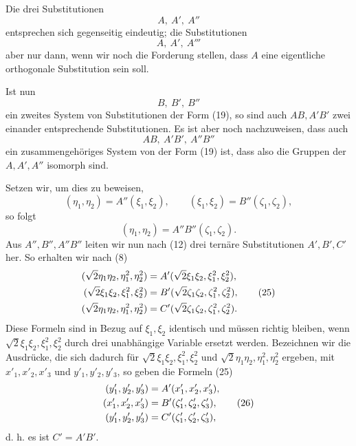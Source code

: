 \documentclass[11pt]{article}
\begin{document}
Die drei Substitutionen
\begin{equation}
A,\ A',\ A''
\tag{19}
\end{equation}
entsprechen sich gegenseitig eindeutig; die Substitutionen
\begin{equation}
A,\ A',\ A'''
\tag{20}
\end{equation}
aber nur dann, wenn wir noch die Forderung stellen, dass $A$ eine eigentliche orthogonale Substitution sein soll.

Ist nun
\begin{equation}
B,\ B',\ B''
\tag{21}
\end{equation}
ein zweites System von Substitutionen der Form (19), so sind auch $AB,A'B'$ zwei einander entsprechende Substitutionen. Es ist aber noch nachzuweisen, dass auch
\begin{equation}
AB,\ A'B',\ A''B''
\tag{22}
\end{equation}
ein zusammengehöriges System von der Form (19) ist, dass also die Gruppen der $A,A',A''$ isomorph sind.

Setzen wir, um dies zu beweisen,
\begin{equation}
(\eta_1,\eta_2)=A''(\xi_1,\xi_2),
\qquad
(\xi_1,\xi_2)=B''(\zeta_1,\zeta_2),
\tag{23}
\end{equation}
so folgt
\begin{equation}
(\eta_1,\eta_2)=A''B''(\zeta_1,\zeta_2).
\tag{24}
\end{equation}
Aus $A'',B'',A''B''$ leiten wir nun nach (12) drei ternäre Substitutionen $A',B',C'$ her. So erhalten wir nach (8)
\begin{align}
(\sqrt2\eta_1\eta_2,\eta_1^2,\eta_2^2)&=A'(\sqrt2\xi_1\xi_2,\xi_1^2,\xi_2^2),\notag\\
(\sqrt2\xi_1\xi_2,\xi_1^2,\xi_2^2)&=B'(\sqrt2\zeta_1\zeta_2,\zeta_1^2,\zeta_2^2),\tag{25}\\
(\sqrt2\eta_1\eta_2,\eta_1^2,\eta_2^2)&=C'(\sqrt2\zeta_1\zeta_2,\zeta_1^2,\zeta_2^2).\notag
\end{align}
Diese Formeln sind in Bezug auf $\xi_1,\xi_2$ identisch und müssen richtig bleiben, wenn $\sqrt2\xi_1\xi_2,\xi_1^2,\xi_2^2$ durch drei unabhängige Variable ersetzt werden. Bezeichnen wir die Ausdrücke, die sich dadurch für $\sqrt2\xi_1\xi_2,\xi_1^2,\xi_2^2$ und $\sqrt2\eta_1\eta_2,\eta_1^2,\eta_2^2$ ergeben, mit $x'_1,x'_2,x'_3$ und $y'_1,y'_2,y'_3$, so geben die Formeln (25)
\begin{align}
(y'_1,y'_2,y'_3)&=A'(x'_1,x'_2,x'_3),\notag\\
(x'_1,x'_2,x'_3)&=B'(\zeta'_1,\zeta'_2,\zeta'_3),\tag{26}\\
(y'_1,y'_2,y'_3)&=C'(\zeta'_1,\zeta'_2,\zeta'_3),\notag
\end{align}
d. h. es ist $C'=A'B'$.
\end{document}
